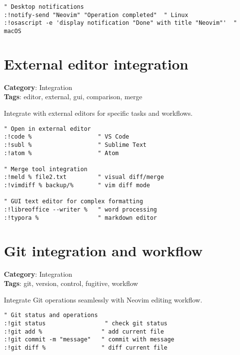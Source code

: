 {{{{{{\begin{Exa*}{}
\begin{Verbatim}[fontsize=\footnotesize, breaklines, breakanywhere]
" Desktop notifications
:!notify-send "Neovim" "Operation completed"  " Linux
:!osascript -e 'display notification "Done" with title "Neovim"'  " macOS
\end{Verbatim}
\end{Exa*}

\section{External editor integration}

\textbf{Category}: Integration\\ \textbf{Tags}: editor, external, gui, comparison, merge
\vspace{0.5cm}

Integrate with external editors for specific tasks and workflows.

\begin{Exa*}{}
\begin{Verbatim}[fontsize=\footnotesize, breaklines, breakanywhere]
" Open in external editor
:!code %                   " VS Code
:!subl %                   " Sublime Text
:!atom %                   " Atom

" Merge tool integration
:!meld % file2.txt         " visual diff/merge
:!vimdiff % backup/%       " vim diff mode

" GUI text editor for complex formatting
:!libreoffice --writer %   " word processing
:!typora %                 " markdown editor
\end{Verbatim}
\end{Exa*}

\section{Git integration and workflow}

\textbf{Category}: Integration\\ \textbf{Tags}: git, version, control, fugitive, workflow
\vspace{0.5cm}

Integrate Git operations seamlessly with Neovim editing workflow.

\begin{Exa*}{}
\begin{Verbatim}[fontsize=\footnotesize, breaklines, breakanywhere]
" Git status and operations
:!git status                 " check git status
:!git add %                 " add current file
:!git commit -m "message"   " commit with message
:!git diff %                " diff current file


\end{Verbatim}
\end{Exa*}}}}}}}
